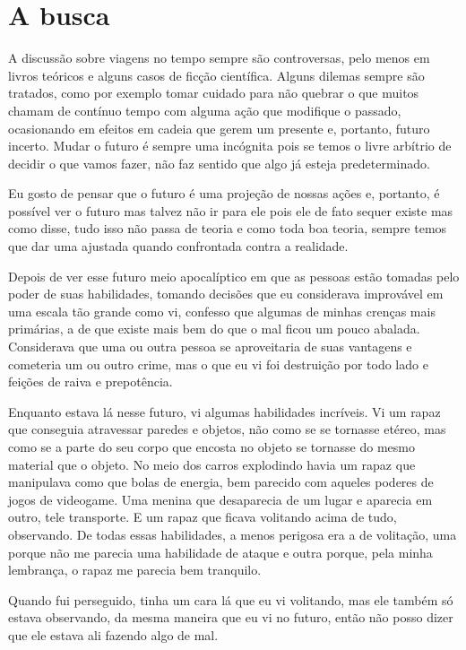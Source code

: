 \chapter{A busca}
A discussão sobre viagens no tempo sempre são controversas, pelo menos em livros teóricos e alguns casos de ficção científica. Alguns dilemas sempre são tratados, como por exemplo tomar cuidado para não quebrar o que muitos chamam de contínuo tempo com alguma ação que modifique o passado, ocasionando em efeitos em cadeia que gerem um presente e, portanto, futuro incerto. Mudar o futuro é sempre uma incógnita pois se temos o livre arbítrio de decidir o que vamos fazer, não faz sentido que algo já esteja predeterminado.

Eu gosto de pensar que o futuro é uma projeção de nossas ações e, portanto, é possível ver o futuro mas talvez não ir para ele pois ele de fato sequer existe mas como disse, tudo isso não passa de teoria e como toda boa teoria, sempre temos que dar uma ajustada quando confrontada contra a realidade.

Depois de ver esse futuro meio apocalíptico em que as pessoas estão tomadas pelo poder de suas habilidades, tomando decisões que eu considerava improvável em uma escala tão grande como vi, confesso que algumas de minhas crenças mais primárias, a de que existe mais bem do que o mal ficou um pouco abalada. Considerava que uma ou outra pessoa se aproveitaria de suas vantagens e cometeria um ou outro crime, mas o que eu vi foi destruição por todo lado e feições de raiva e prepotência.

Enquanto estava lá nesse futuro, vi algumas habilidades incríveis. Vi um rapaz que conseguia atravessar paredes e objetos, não como se se tornasse etéreo, mas como se a parte do seu corpo que encosta no objeto se tornasse do mesmo material que o objeto. No meio dos carros explodindo havia um rapaz que manipulava como que bolas de energia, bem parecido com aqueles poderes de jogos de videogame. Uma menina que desaparecia de um lugar e aparecia em outro, tele transporte. E um rapaz que ficava volitando acima de tudo, observando. De todas essas habilidades, a menos perigosa era a de volitação, uma porque não me parecia uma habilidade de ataque e outra porque, pela minha lembrança, o rapaz me parecia bem tranquilo.

Quando fui perseguido, tinha um cara lá que eu vi volitando, mas ele também só estava observando, da mesma maneira que eu vi no futuro, então não posso dizer que ele estava ali fazendo algo de mal.

